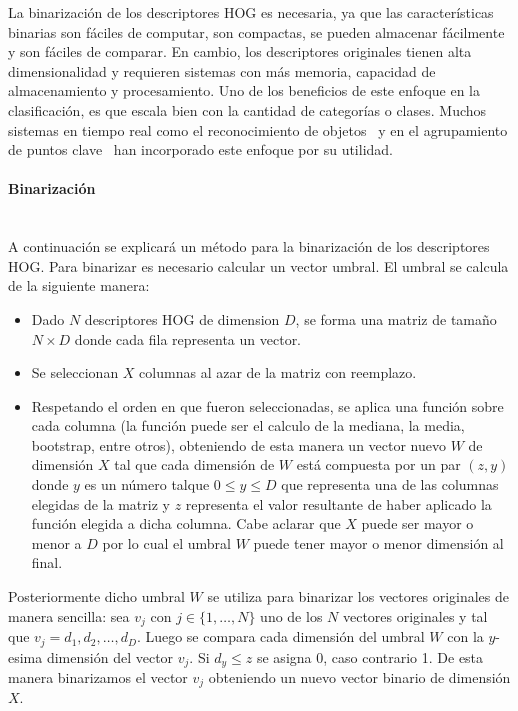 	La binarización de los descriptores HOG es necesaria, ya que las características binarias son fáciles de computar, son compactas, se pueden almacenar fácilmente y son fáciles de comparar. En cambio, los descriptores originales tienen alta dimensionalidad y requieren sistemas con más memoria, capacidad de almacenamiento y procesamiento. Uno de los beneficios de este enfoque en la clasificación, es que escala bien con la cantidad de categorías o clases. Muchos sistemas en tiempo real como el reconocimiento de objetos~\cite{SJC08} y en el agrupamiento de puntos clave~\cite{OFL07} han incorporado este enfoque por su utilidad.

	
	\paragraph{Binarización} ~\\

		A continuación se explicará un método para la binarización de los descriptores HOG. Para binarizar es necesario calcular un vector umbral. El umbral se calcula de la siguiente manera:
		\begin{itemize}
			\item Dado $N$ descriptores HOG de dimension $D$, se forma una matriz de tamaño $N \times D$ donde cada fila representa un vector.
			\item Se seleccionan $X$ columnas al azar de la matriz con reemplazo.
			\item Respetando el orden en que fueron seleccionadas, se aplica una función sobre cada columna (la función puede ser el calculo de la mediana, la media, bootstrap, entre otros), obteniendo de esta manera un vector nuevo $W$ de dimensión $X$ tal que cada dimensión de $W$ está compuesta por un par $(z,y)$ donde $y$ es un número talque $0 \leq y \leq D$ que representa una de las columnas elegidas de la matriz y $z$ representa el valor resultante de haber aplicado la función elegida a dicha columna. Cabe aclarar que $X$ puede ser mayor o menor a $D$ por lo cual el umbral $W$ puede tener mayor o menor dimensión al final.
		\end{itemize}
		
		Posteriormente dicho umbral $W$ se utiliza para binarizar los vectores originales de manera sencilla: sea $v_j$ con $j \in \{1,\dots,N\}$ uno de los $N$ vectores originales y tal que $v_j = d_1,d_2,\dots,d_D$. Luego se compara cada dimensión del umbral $W$ con la $y$-esima dimensión del vector $v_j$. Si $d_y \leq z$ se asigna 0, caso contrario 1. De esta manera binarizamos el vector $v_j$ obteniendo un nuevo vector binario de dimensión $X$.

